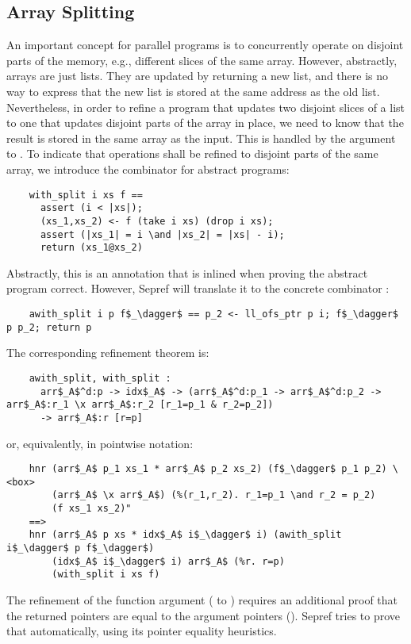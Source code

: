 \documentclass[sn-mathphys,Numbered]{sn-jnl}
\theoremstyle{thmstyleone}%
\theoremstyle{definition}%
\theoremstyle{thmstylethree}%
\begin{document}
  \subsection{Array Splitting}\label{sec:array_split}
  An important concept for parallel programs is to concurrently operate on disjoint parts of the memory,
  e.g., different slices of the same array. However, abstractly, arrays are just lists. They are updated
  by returning a new list, and there is no way to express that the new list is stored at the same address as the old list.
  Nevertheless, in order to refine a program that updates two disjoint slices of a list to one that updates disjoint
  parts of the array in place, we need to know that the result is stored in the same array as the input.
  This is handled by the  argument to . To indicate that operations shall be refined to disjoint parts of the same array, we introduce the
  combinator  for abstract programs:
  \begin{lstlisting}
    with_split i xs f ==
      assert (i < |xs|);
      (xs_1,xs_2) <- f (take i xs) (drop i xs);
      assert (|xs_1| = i \and |xs_2| = |xs| - i);
      return (xs_1@xs_2)
  \end{lstlisting}
  Abstractly, this is an annotation that is inlined when proving the abstract program correct.
  However, Sepref will translate it to the concrete combinator :
  \begin{lstlisting}
    awith_split i p f$_\dagger$ == p_2 <- ll_ofs_ptr p i; f$_\dagger$ p p_2; return p
  \end{lstlisting}
  The corresponding refinement theorem is:
  \begin{lstlisting}
    awith_split, with_split :
      arr$_A$^d:p -> idx$_A$ -> (arr$_A$^d:p_1 -> arr$_A$^d:p_2 -> arr$_A$:r_1 \x arr$_A$:r_2 [r_1=p_1 & r_2=p_2])
      -> arr$_A$:r [r=p]
  \end{lstlisting}
  or, equivalently, in pointwise notation:
  \begin{lstlisting}
    hnr (arr$_A$ p_1 xs_1 * arr$_A$ p_2 xs_2) (f$_\dagger$ p_1 p_2) \<box>
        (arr$_A$ \x arr$_A$) (%(r_1,r_2). r_1=p_1 \and r_2 = p_2)
        (f xs_1 xs_2)"
    ==>
    hnr (arr$_A$ p xs * idx$_A$ i$_\dagger$ i) (awith_split i$_\dagger$ p f$_\dagger$)
        (idx$_A$ i$_\dagger$ i) arr$_A$ (%r. r=p)
        (with_split i xs f)
  \end{lstlisting}
  The refinement of the function argument ( to ) requires an additional proof that the returned pointers
  are equal to the argument pointers ().
  Sepref tries to prove that automatically, using its pointer equality heuristics.
\end{document}
